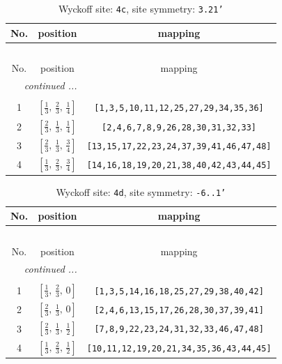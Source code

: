 \documentclass[fleqn,8pt]{jsarticle}
\begin{document}
\renewcommand{\arraystretch}{1.2}
\begin{longtable}{ccc}
\caption{Wyckoff site: {\tt 4c}, site symmetry: {\tt 3.21'}}
 \\
 \hline \hline
No. & position & mapping \\ \hline \endfirsthead

\multicolumn{2}{l}{\tablename\ \thetable{}} \\
 \hline \hline
No. & position & mapping \\ \hline \endhead

 \hline \hline
\multicolumn{2}{r}{\footnotesize\it continued ...} \\ \endfoot

 \hline \hline
\multicolumn{2}{r}{} \\ \endlastfoot

1 & $\left[ \frac{1}{3},\, \frac{2}{3},\, \frac{1}{4} \right]$ & {\tt [1,3,5,10,11,12,25,27,29,34,35,36]} \\ \hline
2 & $\left[ \frac{2}{3},\, \frac{1}{3},\, \frac{1}{4} \right]$ & {\tt [2,4,6,7,8,9,26,28,30,31,32,33]} \\ \hline
3 & $\left[ \frac{2}{3},\, \frac{1}{3},\, \frac{3}{4} \right]$ & {\tt [13,15,17,22,23,24,37,39,41,46,47,48]} \\ \hline
4 & $\left[ \frac{1}{3},\, \frac{2}{3},\, \frac{3}{4} \right]$ & {\tt [14,16,18,19,20,21,38,40,42,43,44,45]} \\
\end{longtable}
\renewcommand{\arraystretch}{1.2}
\begin{longtable}{ccc}
\caption{Wyckoff site: {\tt 4d}, site symmetry: {\tt -6..1'}}
 \\
 \hline \hline
No. & position & mapping \\ \hline \endfirsthead

\multicolumn{2}{l}{\tablename\ \thetable{}} \\
 \hline \hline
No. & position & mapping \\ \hline \endhead

 \hline \hline
\multicolumn{2}{r}{\footnotesize\it continued ...} \\ \endfoot

 \hline \hline
\multicolumn{2}{r}{} \\ \endlastfoot

1 & $\left[ \frac{1}{3},\, \frac{2}{3},\, 0 \right]$ & {\tt [1,3,5,14,16,18,25,27,29,38,40,42]} \\ \hline
2 & $\left[ \frac{2}{3},\, \frac{1}{3},\, 0 \right]$ & {\tt [2,4,6,13,15,17,26,28,30,37,39,41]} \\ \hline
3 & $\left[ \frac{2}{3},\, \frac{1}{3},\, \frac{1}{2} \right]$ & {\tt [7,8,9,22,23,24,31,32,33,46,47,48]} \\ \hline
4 & $\left[ \frac{1}{3},\, \frac{2}{3},\, \frac{1}{2} \right]$ & {\tt [10,11,12,19,20,21,34,35,36,43,44,45]} \\
\end{longtable}
\end{document}
